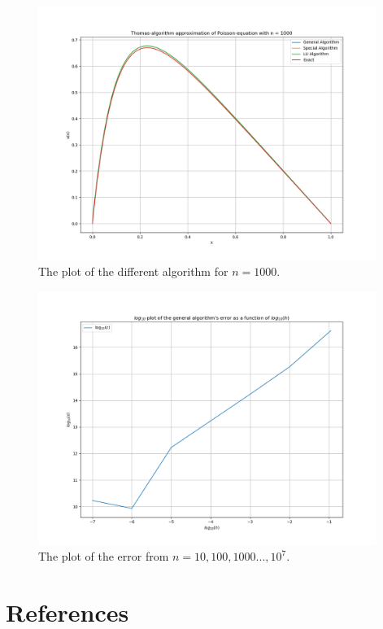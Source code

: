 \documentclass{article}
\begin{document}
\begin{figure}[ht]
	\centering
	\includegraphics[width = 11cm]{program/data1000.png}
	\caption{The plot of the different algorithm for $n = 1000$. }
  \label{fig:data1000png}
\end{figure}

\begin{figure}[ht]
	\centering
	\includegraphics[width = 11cm]{program/error.png}
	\caption{The plot of the error from $n = 10, 100, 1000 ... , 10^7$. }
  \label{fig:errorpng}
\end{figure}



\clearpage

\vspace{1cm}

\section{References} \label{References}
\end{document}
